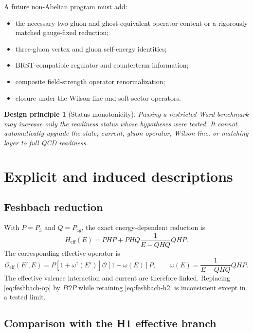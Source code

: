 \documentclass[11pt]{article}
\newtheorem{principle}[definition]{Design principle}
\newcommand{\cO}{\mathcal O}
\newcommand{\eff}{\mathrm{eff}}
\newcommand{\Pthree}{P_3}
\newcommand{\Pfour}{P_{4g}}
\begin{document}
A future non-Abelian program must add:
\begin{itemize}
 \item the necessary two-gluon and ghost-equivalent operator content or a
 rigorously matched gauge-fixed reduction;
 \item three-gluon vertex and gluon self-energy identities;
 \item BRST-compatible regulator and counterterm information;
 \item composite field-strength operator renormalization;
 \item closure under the Wilson-line and soft-sector operators.
\end{itemize}

\begin{principle}[Status monotonicity]
Passing a restricted Ward benchmark may increase only the readiness status
whose hypotheses were tested.  It cannot automatically upgrade the state,
current, gluon operator, Wilson line, or matching layer to full QCD readiness.
\end{principle}

\section{Explicit and induced descriptions}

\subsection{Feshbach reduction}

With \(P=\Pthree\) and \(Q=\Pfour\), the exact energy-dependent reduction is
\begin{equation}
 H_{\eff}(E)
 =
 PHP
 +PHQ\frac{1}{E-QHQ}QHP.
 \label{eq:feshbach-h2}
\end{equation}
The corresponding effective operator is
\begin{equation}
 \cO_{\eff}(E',E)
 =
 P\left[1+\omega^\dagger(E')\right]
 \cO
 \left[1+\omega(E)\right]P,
 \qquad
 \omega(E)=\frac{1}{E-QHQ}QHP.
 \label{eq:feshbach-op}
\end{equation}
The effective valence interaction and current are therefore linked.  Replacing
\cref{eq:feshbach-op} by \(P\cO P\) while retaining
\cref{eq:feshbach-h2} is inconsistent except in a tested limit.

\subsection{Comparison with the H1 effective branch}
\end{document}

